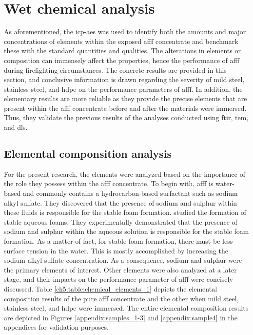 \section{Wet chemical analysis}
\label{ch5:anchor:section:analysis}
As aforementioned, the \acrshort{icp-aes} was used to identify both the amounts and major concentrations of elements within the exposed \acrshort{afff} concentrate and benchmark these with the standard quantities and qualities. The alterations in elements or composition can immensely affect the properties, hence the performance of \acrshort{afff} during firefighting circumstances. The concrete results are provided in this section, and conclusive information is drawn regarding the severity of mild steel, stainless steel, and \acrshort{hdpe} on the performance parameters of \acrshort{afff}. In addition, the elementary results are more reliable as they provide the precise elements that are present within the \acrshort{afff} concentrate before and after the materials were immersed. Thus, they validate the previous results of the analyses conducted using \acrshort{ftir}, \acrshort{tem}, and \acrshort{dls}.

\subsection{Elemental componsition analysis}
For the present research, the elements were analyzed based on the importance of the role they possess within the \acrshort{afff} concentrate. To begin with, \acrshort{afff} is water-based and commonly contains a hydrocarbon-based surfactant such as sodium alkyl sulfate. They discovered that the presence of sodium and sulphur within these fluids is responsible for the stable foam formation. \cite{yu2020formation} studied the formation of stable aqueous foams. They experimentally demonstrated that the presence of sodium and sulphur within the aqueous solution is responsible for the stable foam formation. As a matter of fact, for stable foam formation, there must be less surface tension in the water. This is mostly accomplished by increasing the sodium alkyl sulfate concentration. As a consequence, sodium and sulphur were the primary elements of interest. Other elements were also analyzed at a later stage, and their impacts on the performance parameter of \acrshort{afff} were concisely discussed. Table \ref{ch5:table:chemical_elements_1} depicts the elemental composition results of the pure \acrshort{afff} concentrate and the other when mild steel, stainless steel, and \acrshort{hdpe} were immersed. The entire elemental composition results are depicted in Figures \ref{appendix:samples_1-3} and \ref{appendix:sample4} in the appendices for validation purposes.

